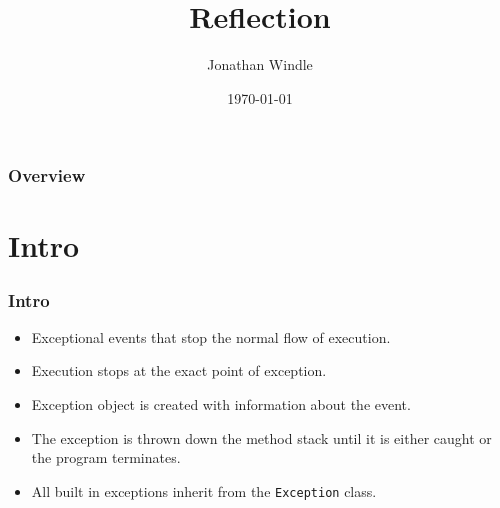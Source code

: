 \documentclass{beamer}
\title[Reflection]{Reflection} %
\author{Jonathan Windle} %
\institute[UEA] %
{
University of East Anglia \\ %
\medskip
\textit{J.Windle@uea.ac.uk} %
}
\date{\today} %
\begin{document}
\begin{frame}
\titlepage %
\end{frame}

\begin{frame}[allowframebreaks]
\frametitle{Overview} %
\tableofcontents %
\end{frame}

\section{Intro}
\begin{frame}
\frametitle{Intro}
\begin{itemize}
\item Exceptional events that stop the normal flow of execution.
\item Execution stops at the exact point of exception.
\item {\color{red} Exception object} is created with information about the event.
\item The exception is {\color{green}thrown} down the method stack until it is either {\color{orange} caught} or the program terminates.
\item All built in exceptions inherit from the \texttt{Exception} class.
\end{itemize}
\end{frame}
\end{document}
